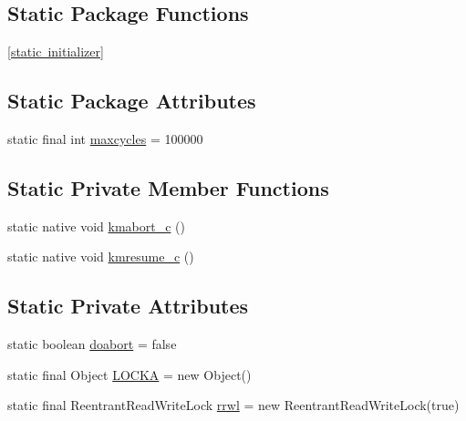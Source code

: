 \subsection*{Static Package Functions}
\begin{DoxyCompactItemize}
\item 
\mbox{\hyperlink{classcom_1_1example_1_1dmocl_1_1kmeans_a7fc606187903f49e8337e25de361bb32}{\mbox{[}static initializer\mbox{]}}}
\end{DoxyCompactItemize}
\subsection*{Static Package Attributes}
\begin{DoxyCompactItemize}
\item 
static final int \mbox{\hyperlink{classcom_1_1example_1_1dmocl_1_1kmeans_a1958a2698dea6fdc45c9a4986b48600f}{maxcycles}} = 100000
\end{DoxyCompactItemize}
\subsection*{Static Private Member Functions}
\begin{DoxyCompactItemize}
\item 
static native void \mbox{\hyperlink{classcom_1_1example_1_1dmocl_1_1kmeans_aaf412fa93eb8398f864218c5539342c8}{kmabort\+\_\+c}} ()
\item 
static native void \mbox{\hyperlink{classcom_1_1example_1_1dmocl_1_1kmeans_ab1cebe9efa8c81a62ccde2e6abf035c3}{kmresume\+\_\+c}} ()
\end{DoxyCompactItemize}
\subsection*{Static Private Attributes}
\begin{DoxyCompactItemize}
\item 
static boolean \mbox{\hyperlink{classcom_1_1example_1_1dmocl_1_1kmeans_ab7e7caf50f0c42b24eb806bf516c341e}{doabort}} = false
\item 
static final Object \mbox{\hyperlink{classcom_1_1example_1_1dmocl_1_1kmeans_ae84443fbb3a0c2eddc98d4cead831f5f}{L\+O\+C\+KA}} = new Object()
\item 
static final Reentrant\+Read\+Write\+Lock \mbox{\hyperlink{classcom_1_1example_1_1dmocl_1_1kmeans_a14088f43cd0164591d1fb9df377fc708}{rrwl}} = new Reentrant\+Read\+Write\+Lock(true)
\end{DoxyCompactItemize}


